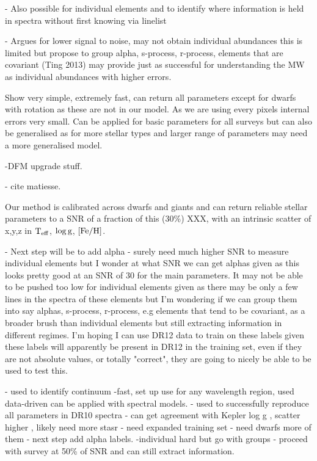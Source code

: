\documentclass[12pt, preprint]{aastex}
\newcommand{\teff}{\mbox{$\rm T_{eff}$}}
\newcommand{\feh}{\mbox{$\rm [Fe/H]$}}
\newcommand{\logg}{\mbox{$\rm \log g$}}
\begin{document}
- Also possible for individual elements and to identify where information is held in spectra without first knowing via linelist

- Argues for lower signal to noise, may not obtain individual abundances this is limited but propose to group alpha, s-process, r-process, elements that are covariant (Ting 2013) may provide just as successful for understanding the MW as individual abundances with higher errors. 



Show very simple, extremely fast, can return all parameters except for dwarfs with rotation as these are not in our model. As we are using every pixels internal errors very small. Can be applied for basic parameters for all surveys but can also be generalised as for more stellar types and larger range of parameters may need a more generalised model. 

-DFM upgrade stuff. 

- cite matiesse. 

Our method is calibrated across dwarfs and giants and can return reliable stellar parameters to a SNR of a fraction of this (30\%) XXX, with an intrinsic scatter of x,y,z in \teff, \logg, \feh.

- Next step will be to add alpha - surely need much higher SNR to measure individual elements but 
I wonder at what SNR we can get alphas given as this looks pretty good at an SNR of 30 for the main parameters. It may not be able to be pushed too low for individual elements given as there may be only a few lines in the spectra of these elements but I'm wondering if we can group them into say alphas, s-process, r-process, e.g elements that tend to be covariant, as a broader brush than individual elements but still extracting information in different regimes. I'm hoping I can use DR12 data to train on these labels given these labels will apparently be present in DR12 in the training set, even if they are not absolute values, or totally "correct", they are going to nicely be able to be used to test this. 

- used to identify continuum
-fast, set up use for any wavelength region, used data-driven can be applied with spectral models. 
- used to successfully reproduce all parameters in DR10 spectra
- can get agreement with Kepler log g , scatter higher , likely need more stasr
- need expanded training set - need dwarfs more of them
- next step add alpha labels. 
-individual hard but go with groups
- proceed with survey at 50\% of SNR and can still extract information.
\end{document}
